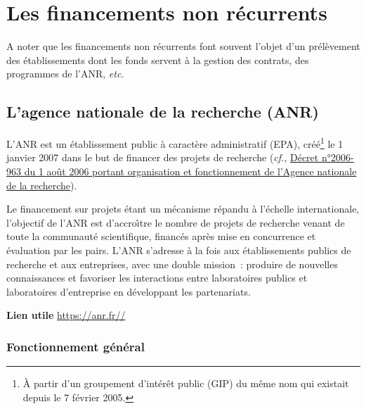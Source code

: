 

\chapter{Les financements non r\'ecurrents}
\label{financement-projets}



A noter que les financements non r\'ecurrents font souvent l'objet d'un
pr\'el\`evement des {\'e}tablissements dont les fonds servent \`a la gestion des contrats,
des programmes de l'ANR, {\em etc.}


\section{L'agence nationale de la recherche (ANR)}

L'ANR est un \'etablissement public \`a caract\`ere administratif (EPA),
cr\'e\'e\footnote{\`A partir d'un groupement d'int\'er\^et public (GIP) du m\^eme nom
qui existait depuis le 7 f\'evrier 2005.} le 1\ier{} janvier 2007
dans le but de financer des projets de recherche ({\em cf.}, \href{https://www.legifrance.gouv.fr/loda/id/LEGITEXT000006054155}{D\'ecret n°2006-963 du 1 ao\^ut 2006 portant organisation et fonctionnement de l'Agence nationale de la recherche}).

Le financement sur projets \'etant un m\'ecanisme
r\'epandu \`a l'\'echelle internationale,
l'objectif de l'ANR est d'accro\^\i  tre le nombre de projets de
recherche venant de toute la communaut\'e scientifique, financ\'es
apr\`es mise en concurrence et \'evaluation par les pairs.
L'ANR s'adresse \`a la fois aux \'etablissements publics de recherche
et aux entreprises, avec une double mission~: produire de nouvelles
connaissances et favoriser les interactions entre laboratoires
publics et laboratoires d'entreprise en d\'eveloppant les
partenariats.

\textbf{Lien utile\hspace{.5em}} \url{https://anr.fr//}

\subsection{Fonctionnement g\'en\'eral}


